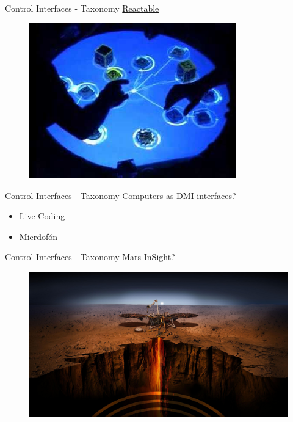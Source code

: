\documentclass{beamer}
\begin{document}
\begin{frame}{Control Interfaces - Taxonomy}
    \href{https://www.youtube.com/watch?v=vm_FzLya8y4}{Reactable}
    \begin{figure}[h]
        \includegraphics[width=0.8\textwidth]{reactable.jpg}
    \end{figure}
\end{frame}


\begin{frame}{Control Interfaces - Taxonomy}
    Computers as DMI interfaces?
    \begin{itemize}
        \item \href{https://www.youtube.com/watch?v=Tjf-NJNfOP4}{Live Coding}
        \item \href{https://www.youtube.com/watch?v=YSnb4beoSy4}{Mierdofón}
    \end{itemize}
\end{frame}

\begin{frame}{Control Interfaces - Taxonomy}
    \href{https://www.youtube.com/watch?v=yT50Q_Zbf3s}{Mars InSight?}
    \begin{figure}[h]
        \includegraphics[width=\textwidth]{insight.jpg}
    \end{figure}
\end{frame}
\end{document}

